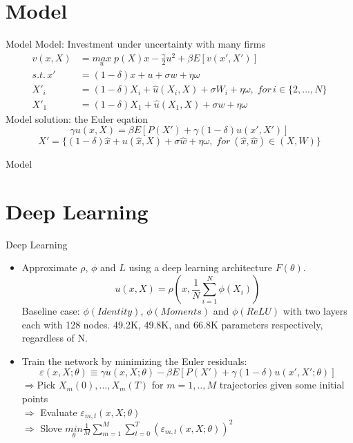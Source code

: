 \documentclass[dvipsnames,mathserif]{beamer}
\begin{document}
{\section{Model}
\begin{frame}{Model}
Model: Investment under uncertainty with many firms
    \begin{align*}
    v(x,X) & = \underset{u}{max}\;{p(X)x - \frac{\gamma}{2}u^2 + \beta E[v(x',X')]}\\
    s.t. \, x'&= (1-\delta)x + u + \sigma w + \eta \omega\\
    X'_{i} &= (1-\delta)X_{i} + \hat{u}(X_{i},X) + \sigma W_{i} + \eta \omega, \; for \, i\in\{2,...,N\}\\
    X'_1 &= (1-\delta)X_1 + \hat{u}(X_1,X) + \sigma w + \eta \omega
    \end{align*}
Model solution: the Euler eqation
\[\gamma u(x,X) = \beta E[P(X') + \gamma (1-\delta)u(x',X')]\]
\[X' = \{(1-\delta)\hat{x} + u(\hat{x},X) + \sigma \hat{w} + \eta \omega,\; for \: (\hat{x},\hat{w}) \in (X,W)\}\]
\end{frame}
\begin{frame}{Model}


\end{frame}
\section{Deep Learning}
\begin{frame}{Deep Learning}
    \begin{itemize}
        \item Approximate $\rho$, $\phi$ and $L$ using a deep learning architecture $F(\theta)$.
        \[u(x,X) = \rho(x,\frac{1}{N}\sum_{i=1}^{N}\phi(X_i))\]
        Baseline case: $\phi(Identity)$, $\phi(Moments)$ and $\phi(ReLU)$ with two layers each with 128 nodes. 49.2K, 49.8K, and 66.8K parameters respectively, regardless of N.
        \vspace{0.1cm}
        \item Train the network by minimizing the Euler residuals:
        \[\varepsilon(x,X;\theta) \equiv \gamma u(x,X;\theta) - \beta E[P(X') + \gamma (1-\delta)u(x',X';\theta)]\]
        $\Rightarrow$Pick ${X_m(0), ..., X_m(T )}$ for $m = 1, .., M$ trajectories given some initial points \\$\Rightarrow$ Evaluate $\varepsilon_{m,t}(x, X; \theta)$  \\$\Rightarrow$ Slove $\underset{\theta}{min}\frac{1}{M}\sum_{m=1}^{M}\sum_{t=0}^{T}(\varepsilon_{m,t}(x,X;\theta))^2$
    \end{itemize}
\end{frame}



}
\end{document}
